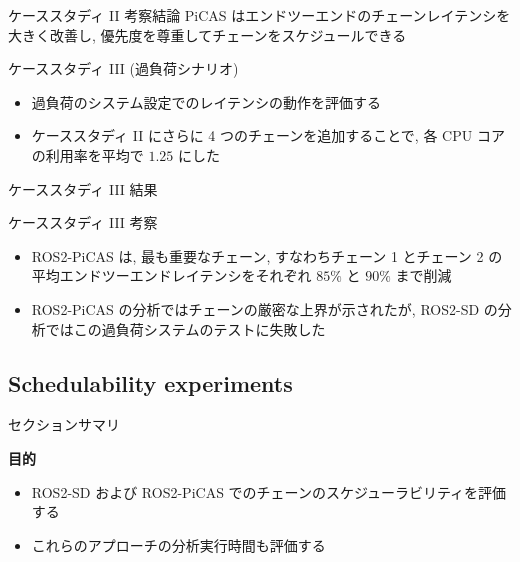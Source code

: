 \begin{frame}{ケーススタディ II 考察結論}
    PiCAS はエンドツーエンドのチェーンレイテンシを大きく改善し, 優先度を尊重してチェーンをスケジュールできる
\end{frame}


\begin{frame}{ケーススタディ III (過負荷シナリオ)}
    \begin{itemize}
        \item 過負荷のシステム設定でのレイテンシの動作を評価する
        \item ケーススタディ II にさらに 4 つのチェーンを追加することで, 各 CPU コアの利用率を平均で $1.25$ にした
    \end{itemize}
\end{frame}

\begin{frame}{ケーススタディ III 結果}
\end{frame}

\begin{frame}{ケーススタディ III 考察}
    \begin{itemize}
        \item ROS2-PiCAS は, 最も重要なチェーン, すなわちチェーン 1 とチェーン 2 の平均エンドツーエンドレイテンシをそれぞれ $85 \%$ と $90 \%$ まで削減
        \item ROS2-PiCAS の分析ではチェーンの厳密な上界が示されたが, ROS2-SD の分析ではこの過負荷システムのテストに失敗した
    \end{itemize}
\end{frame}


\subsection{Schedulability experiments}
\label{ssec: schedulability experiments}

\begin{frame}{セクションサマリ}
    \begin{itembox}[l]{\textbf{目的}}
        \begin{itemize}
            \item ROS2-SD および ROS2-PiCAS でのチェーンのスケジューラビリティを評価する
            \item これらのアプローチの分析実行時間も評価する
        \end{itemize}
    \end{itembox}
\end{frame}

